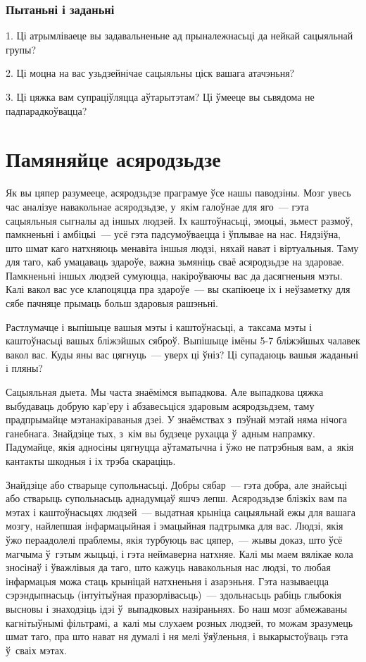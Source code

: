 \subsubsection{Пытаньні і заданьні}

1. Ці атрымліваеце вы задавальненьне ад прыналежнасьці да нейкай сацыяльнай групы?

2. Ці моцна на вас узьдзейнічае сацыяльны ціск вашага атачэньня?

3. Ці цяжка вам супраціўляцца аўтарытэтам? Ці ўмееце вы сьвядома не падпарадкоўвацца?


\section{Памяняйце асяродзьдзе}

Як вы цяпер разумееце, асяродзьдзе праграмуе ўсе нашы паводзіны. Мозг увесь час аналізуе навакольнае асяродзьдзе, у~якім галоўнае для яго~--- гэта сацыяльныя сыгналы ад іншых людзей. Іх каштоўнасьці, эмоцыі, зьмест размоў, памкненьні і амбіцыі~--- усё гэта падсумоўваецца і ўплывае на нас. Нядзіўна, што шмат каго натхняюць менавіта іншыя людзі, няхай нават і віртуальныя. Таму для таго, каб умацаваць здароўе, важна зьмяніць сваё асяродзьдзе на здаровае. Памкненьні іншых людзей сумуюцца, накіроўваючы вас да дасягненьня мэты. Калі вакол вас усе клапоцяцца пра здароўе~--- вы скапіюеце іх і неўзаметку для сябе пачняце прымаць больш здаровыя рашэньні.

Растлумачце і выпішыце вашыя мэты і каштоўнасьці, а~таксама мэты і каштоўнасьці вашых бліжэйшых сяброў. Выпішыце імёны 5-7 бліжэйшых чалавек вакол вас. Куды яны вас цягнуць~--- уверх ці ўніз? Ці супадаюць вашыя жаданьні і пляны?

Сацыяльная дыета. Мы часта знаёмімся выпадкова. Але выпадкова цяжка выбудаваць добрую кар'еру і абзавесьціся здаровым асяродзьдзем, таму прадпрымайце мэтанакіраваныя дзеі. У знаёмствах з~пэўнай мэтай няма нічога ганебнага. Знайдзіце тых, з~кім вы будзеце рухацца ў~адным напрамку. Падумайце, якія адносіны цягнуцца аўтаматычна і ўжо не патрэбныя вам, а~якія кантакты шкодныя і іх трэба скараціць.

Знайдзіце або стварыце супольнасьці. Добры сябар~--- гэта добра, але знайсьці або стварыць супольнасьць аднадумцаў яшчэ лепш. Асяродзьдзе блізкіх вам па мэтах і каштоўнасьцях людзей~--- выдатная крыніца сацыяльнай ежы для вашага мозгу, найлепшая інфармацыйная і эмацыйная падтрымка для вас. Людзі, якія ўжо пераадолелі праблемы, якія турбуюць вас цяпер,~--- жывы доказ, што ўсё магчыма ў~гэтым жыцьці, і гэта неймаверна натхняе. Калі мы маем вялікае кола зносінаў і ўважлівыя да таго, што кажуць навакольныя нас людзі, то любая інфармацыя можа стаць крыніцай натхненьня і азарэньня. Гэта называецца сэрэндыпнасьць (інтуітыўная празорлівасьць)~--- здольнасьць рабіць глыбокія высновы і знаходзіць ідэі ў~выпадковых назіраньнях. Бо наш мозг абмежаваны кагнітыўнымі фільтрамі, а~калі мы слухаем розных людзей, то можам зразумець шмат таго, пра што нават ня думалі і ня мелі ўяўленьня, і выкарыстоўваць гэта ў~сваіх мэтах.

